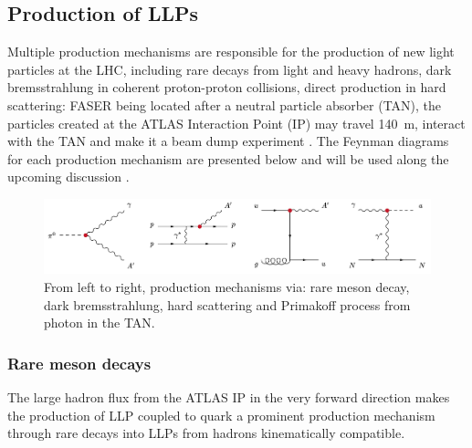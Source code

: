 		\subsection{Production of LLPs}
		Multiple production mechanisms are responsible for the production of new light particles at the LHC, including rare decays from light and heavy hadrons, dark bremsstrahlung in coherent proton-proton collisions, direct production in hard scattering: FASER being located after a neutral particle absorber (TAN), the particles created at the ATLAS Interaction Point (IP) may travel \SI{140}{\meter}, interact with the TAN and make it a beam dump experiment \cite{FASER_LLP}. The Feynman diagrams for each production mechanism are presented below and will be used along the upcoming discussion \cite{FASER_LLP}.
		\begin{figure}[h]
			\centering
			\includegraphics[width=0.95\linewidth]{files/Feynman_production_mechanism}
			\caption{From left to right, production mechanisms via: rare meson decay, dark bremsstrahlung, hard scattering and Primakoff process from photon in the TAN.}
			\label{im:prod_mech_feynman}
		\end{figure}
		\subsubsection{Rare meson decays}
		The large hadron flux from the ATLAS IP in the very forward direction makes the production of LLP coupled to quark a prominent production mechanism through rare decays into LLPs from hadrons kinematically compatible. 
	
